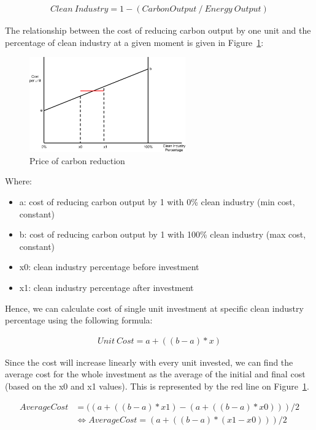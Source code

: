 \begin{align*}
Clean~Industry = 1 - (Carbon Output~/~Energy~Output)
\end{align*}
 
The relationship between the cost of reducing carbon output by one unit and the percentage of 
clean industry at a given moment is given in Figure~\ref{fig:carbon_reduction}:

\begin{figure}[h!]
	\centering
	\includegraphics[width=0.6\textwidth]{img/carbon-reduction.png}
	\caption{Price of carbon reduction}
	\label{fig:carbon_reduction}
\end{figure}

Where:
\begin{itemize}
	\item a: cost of reducing carbon output by 1 with 0\% clean industry (min cost, constant)
	\item b: cost of reducing carbon output by 1 with 100\% clean industry (max cost, constant)
	\item x0: clean industry percentage before investment
	\item x1: clean industry percentage after investment
\end{itemize}

 
Hence, we can calculate cost of single unit investment at specific clean industry percentage using the following formula:

\begin{align*}
Unit~Cost = a + ((b - a) * x)
\end{align*}

Since the cost will increase linearly with every unit invested, we can find the average cost for the whole investment as the average of the initial and final cost (based on the x0 and x1 values). This is represented by the red line on Figure~\ref{fig:carbon_reduction}.
 
\begin{align*}
Average Cost &= ((a + ((b - a) * x1) - (a + ((b-a) * x0))) / 2 \\
&\Leftrightarrow Average  Cost = (a + ((b - a) * (x1 - x0))) / 2
\end{align*}

